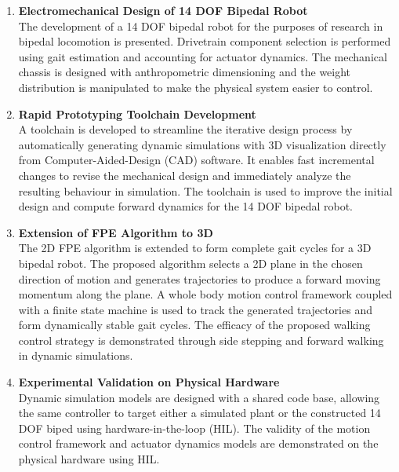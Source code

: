 \begin{enumerate}
	\item \textbf{Electromechanical Design of 14 DOF Bipedal Robot} \\ 
	The development of a 14 DOF bipedal robot for the purposes of research in bipedal locomotion is presented. Drivetrain component selection is performed using gait estimation and accounting for actuator dynamics. The mechanical chassis is designed with anthropometric dimensioning and the weight distribution is manipulated to make the physical system easier to control.  \\

	\item \textbf{Rapid Prototyping Toolchain Development} \\ 
	A toolchain is developed to streamline the iterative design process by automatically generating dynamic simulations with 3D visualization directly from Computer-Aided-Design (CAD) software. It enables fast incremental changes to revise the mechanical design and immediately analyze the resulting behaviour in simulation. The toolchain is used to improve the initial design and compute forward dynamics for the 14 DOF bipedal robot. \\

	\item \textbf{Extension of FPE Algorithm to 3D} \\ 
	The 2D FPE algorithm is extended to form complete gait cycles for a 3D bipedal robot. The proposed algorithm selects a 2D plane in the chosen direction of motion and generates trajectories to produce a forward moving momentum along the plane. A whole body motion control framework coupled with a finite state machine is used to track the generated trajectories and form dynamically stable gait cycles. The efficacy of the proposed walking control strategy is demonstrated through side stepping and forward walking in dynamic simulations. \\

	\item \textbf{Experimental Validation on Physical Hardware} \\ 
	Dynamic simulation models are designed with a shared code base, allowing the same controller to target either a simulated plant or the constructed 14 DOF biped using hardware-in-the-loop (HIL). The validity of the motion control framework and actuator dynamics models are demonstrated on the physical hardware using HIL. \\

\end{enumerate}

